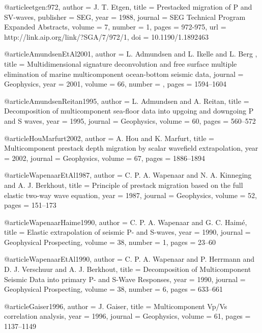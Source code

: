 @article{etgen:972,
  author =	 {J. T. Etgen},
  title =	 {Prestacked migration of {P} and {S}{V}-waves},
  publisher =	 {SEG},
  year =	 1988,
  journal =	 {SEG Technical Program Expanded Abstracts},
  volume =	 7,
  number =	 1,
  pages =	 {972-975},
  url =		 {http://link.aip.org/link/?SGA/7/972/1},
  doi =		 {10.1190/1.1892463}
}

@article{AmundsenEtAl2001,
author = {L. Admundsen and L. Ikelle and L. Berg },
title = {Multidimensional signature deconvolution and free surface multiple elimination of marine multicomponent ocean-bottom seismic data},
journal = {Geophysics},
year = {2001},
volume = {66},
number = {},
pages = {1594--1604}
}

@article{AmundsenReitan1995,
  author =	 {L. Admundsen and A. Reitan},
  title =	 {Decomposition of multicomponent sea-floor data into
                  upgoing and downgoing {P} and {S} waves},
  year =	 1995,
  journal =	 {Geophysics},
  volume =	 60,
  pages =	 {560--572}
}

@article{HouMarfurt2002,
  author =	 {A. Hou and K. Marfurt},
  title =	 {Multicomponent prestack depth migration by scalar
                  wavefield extrapolation},
  year =	 2002,
  journal =	 {Geophysics},
  volume =	 67,
  pages =	 {1886--1894}
}

@article{WapenaarEtAl1987,
  author =	 {C. P. A. Wapenaar and N. A. Kinneging and
                  A. J. Berkhout},
  title =	 {Principle of prestack migration based on the full
                  elastic two-way wave equation},
  year =	 1987,
  journal =	 {Geophysics},
  volume =	 52,
  pages =	 {151--173}
}

@article{WapenaarHaime1990,
  author =	 {C. P. A. Wapenaar and G. C. Haim\'{e}},
  title =	 {Elastic extrapolation of seismic {P}- and {S}-waves},
  year =	 1990,
  journal =	 {Geophysical Prospecting},
  volume =	 38,
  number =	 1,
  pages =	 {23--60}
}

@article{WapenaarEtAl1990,
  author =	 {C. P. A. Wapenaar and P. Herrmann and
                  D. J. Verschuur and A. J. Berkhout},
  title =	 {Decomposition of Multicomponent Seismic Data into
                  primary {P}- and {S}-Wave Responses},
  year =	 1990,
  journal =	 {Geophysical Prospecting},
  volume =	 38,
  number =	 6,
  pages =	 {633--661}
}

@article{Gaiser1996,
  author =	 {J. Gaiser},
  title =	 {Multicomponent {V}p/{V}s correlation analysis},
  year =	 1996,
  journal =	 {Geophysics},
  volume =	 61,
  pages =	 {1137--1149}
}

